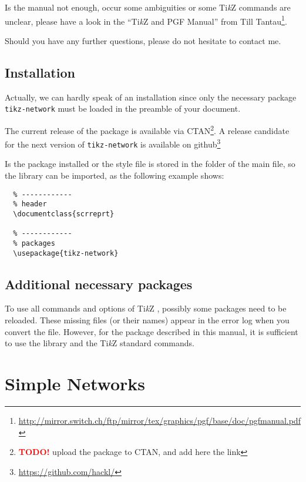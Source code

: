 \documentclass[a4paper,twosided,notoc]{tufte-book}
\newcommand{\TODO}{\textcolor{red}{\bf TODO!}\xspace}
\newcommand{\doccls}[1]{\texttt{#1}}%
\newenvironment{docspec}{\begin{shaded}}{\vspace{-5mm}\end{shaded}}%
\newcommand{\pkg}{\doccls{tikz-network}\xspace}
\newcommand{\tikzsym}{Ti\emph{k}Z }
\begin{document}
Is the manual not enough, occur some ambiguities or some \tikzsym commands are unclear, please have a look in the ``\tikzsym and PGF Manual'' from Till Tantau\footnote{\url{http://mirror.switch.ch/ftp/mirror/tex/graphics/pgf/base/doc/pgfmanual.pdf}}.

Should you have any further questions, please do not hesitate to contact me. 

\section{Installation}
\label{sec:Installation}

Actually, we can hardly speak of an installation since only the necessary package \pkg must be loaded in the preamble of your document.

The current release of the package is available via CTAN\footnote{\TODO upload the package to CTAN, and add here the link}. A release candidate for the next version of \pkg is available on github\footnote{\url{https://github.com/hackl/}}

Is the package installed or the style file is stored in the folder of the main file, so the library can be imported, as the following example shows:

\begin{docspec}
\begin{lstlisting}
  % ------------
  % header
  \documentclass{scrreprt}

  % ------------
  % packages
  \usepackage{tikz-network}
\end{lstlisting}
\end{docspec}

\section{Additional necessary packages}

To use all commands and options of \tikzsym, possibly some packages need to be reloaded. These missing files (or their names) appear in the error log when you convert the file. However, for the package described in this manual, it is sufficient to use the library and the \tikzsym standard commands.

\chapter{Simple Networks}
\label{chap:simple_networks}
\end{document}
